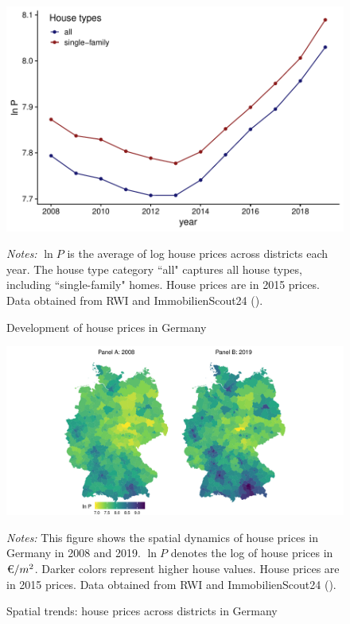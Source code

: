\documentclass[
  12pt,
]{article}
\begin{document}
\begin{figure}[H]
\centering

\begin{center}\includegraphics{output/figs/price-growth-1} \end{center}

\caption{Development of house prices in Germany}\label{fig:price-growth}
\medskip
\begin{minipage}{0.9\textwidth}
\footnotesize
\textit{Notes:} $\ln P$ is the average of log house prices across districts each year. The house type category ``all" captures all house types, including ``single-family" homes. House prices are in 2015 prices. Data obtained from RWI and ImmobilienScout24 ().
\end{minipage}
\end{figure}

\begin{figure}[h]
\centering

\begin{center}\includegraphics{output/figs/spatial-pattern-1} \end{center}

\caption{Spatial trends: house prices across districts in Germany}\label{fig:spatial-pattern}
\medskip
\begin{minipage}{0.9\textwidth}
\footnotesize
\textit{Notes:} This figure shows the spatial dynamics of house prices in Germany in 2008 and 2019. $\ln P$ denotes the log of house prices in $\text{\texteuro}/m^2$. Darker colors represent higher house values. House prices are in 2015 prices. Data obtained from RWI and ImmobilienScout24 ().
\end{minipage}
\end{figure}
\end{document}
